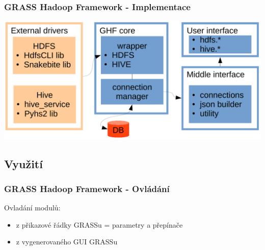 \documentclass[unicode,bookmarksnumbered]{beamer}
\begin{document}
		
		\begin{frame}
			\frametitle{GRASS Hadoop Framework - Implementace}
			\centering
			\includegraphics[width=1\textwidth]{./img/ghf/implementation.pdf}
		\end{frame}
	
	
	\subsection{Využití}
			\begin{frame}
				\frametitle{GRASS Hadoop Framework - Ovládání}
				Ovladání modulů:
			
				\begin{itemize}
					\item  z přikazové řádky GRASSu = parametry a přepínače
					\item  z vygenerovaného GUI GRASSu
				\end{itemize}
				
			\end{frame}
			
\end{document}
